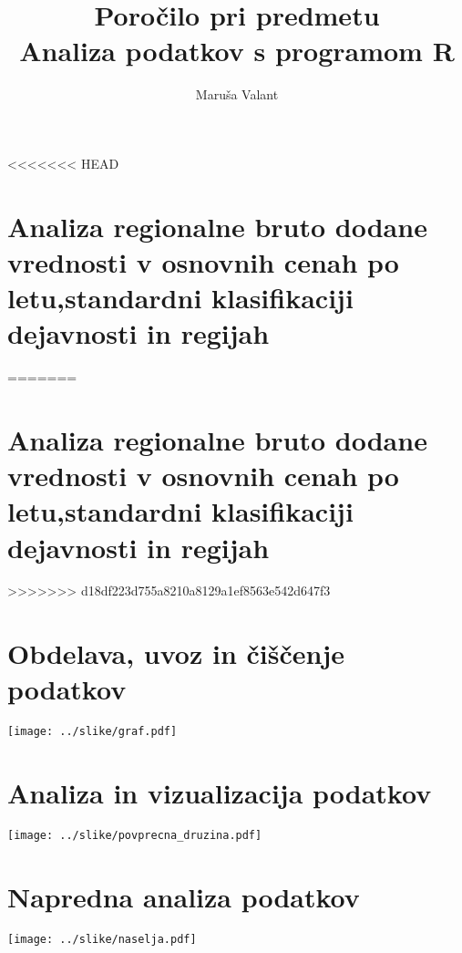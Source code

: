 \documentclass[11pt,a4paper]{article}
\begin{document}
\title{Poročilo pri predmetu \\
Analiza podatkov s programom R}
\author{Maruša Valant}
\maketitle

<<<<<<< HEAD
\section{Analiza regionalne bruto dodane vrednosti v osnovnih cenah po letu,standardni klasifikaciji dejavnosti in regijah}
=======
\section{Analiza regionalne bruto dodane vrednosti v osnovnih cenah po letu,standardni klasifikaciji dejavnosti in regijah} 
>>>>>>> d18df223d755a8210a8129a1ef8563e542d647f3

\section{Obdelava, uvoz in čiščenje podatkov}

\texttt{[image: ../slike/graf.pdf]}

\section{Analiza in vizualizacija podatkov}

\texttt{[image: ../slike/povprecna\_druzina.pdf]}

\section{Napredna analiza podatkov}

\texttt{[image: ../slike/naselja.pdf]}
\end{document}
